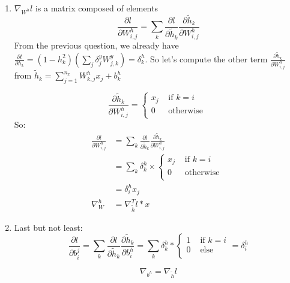 \begin{enumerate}
    \item $ \nabla _{W^h} l $ is a matrix composed of elements
          \[
              \frac{\partial l}{\partial W^h _{i,j}} = \sum_{k}^{} \frac{\partial l}{\partial \tilde{h}_k} \frac{\partial \tilde{h}_k}{\partial W^h_{i,j}}
          \]
          From the previous question, we already have $ \frac{\partial l}{\partial h_k} = (1 - h_k^2) (\sum_{j}^{} \delta ^y_j W^y_{j,k}) = \delta_k^h$. So let's compute the other term $ \frac{\partial \tilde{h}_k}{\partial W^h_{i,j}}  $ from $ \tilde{h}_k = \sum_{j=1}^{n_x} W^h_{k,j} x_j + b_k^h $

          \[
              \frac{\partial \tilde{h}_k}{\partial W^h_{i,j}} = \begin{cases}
                  x_j & \text{ if } k = i  \\
                  0   & \text{ otherwise } \\
              \end{cases}
          \]
          So:
          \begin{align*}
              \frac{\partial l}{\partial W^h _{i,j}} & = \sum_{k}^{} \frac{\partial l}{\partial \tilde{h}_k} \frac{\partial \tilde{h}_k}{\partial W^h_{i,j}} \\
                                                     & = \sum_{k}^{}\delta ^h_k \times \begin{cases}
                  x_j & \text{ if } k = i  \\
                  0   & \text{ otherwise } \\
              \end{cases}                                            \\
                                                     & = \delta _i^h x_j                                                                                     \\
              \nabla _W^h                            & = \nabla _{\tilde{h}} ^T l * x
          \end{align*}


    \item Last but not least:
          \[
              \frac{\partial l}{\partial b_i^j} = \sum_{k}^{} \frac{\partial l}{\partial \tilde{h}_k} \frac{\partial \tilde{h}_k}{\partial b_i^h} = \sum_{k}^{}\delta _k^h * \begin{cases}
                  1 & \text{ if } k = i \\
                  0 & \text{ else}      \\
              \end{cases} = \delta ^h_i
          \]

          \[
              \nabla _{b^h} = \nabla _{\tilde{h}} l
          \]

\end{enumerate}

